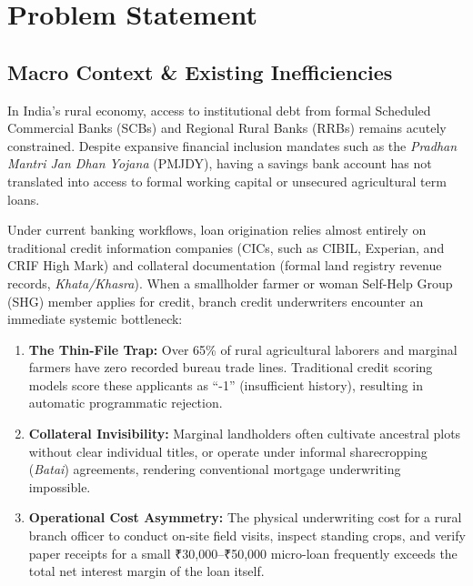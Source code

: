 \chapter{Problem Statement}
\label{chap:problem_statement}

\section{Macro Context \& Existing Inefficiencies}
In India's rural economy, access to institutional debt from formal Scheduled Commercial Banks (SCBs) and Regional Rural Banks (RRBs) remains acutely constrained. Despite expansive financial inclusion mandates such as the \textit{Pradhan Mantri Jan Dhan Yojana} (PMJDY), having a savings bank account has not translated into access to formal working capital or unsecured agricultural term loans. 

Under current banking workflows, loan origination relies almost entirely on traditional credit information companies (CICs, such as CIBIL, Experian, and CRIF High Mark) and collateral documentation (formal land registry revenue records, \textit{Khata/Khasra}). When a smallholder farmer or woman Self-Help Group (SHG) member applies for credit, branch credit underwriters encounter an immediate systemic bottleneck:
\begin{enumerate}
  \item \textbf{The Thin-File Trap:} Over 65\% of rural agricultural laborers and marginal farmers have zero recorded bureau trade lines. Traditional credit scoring models score these applicants as ``-1'' (insufficient history), resulting in automatic programmatic rejection.
  \item \textbf{Collateral Invisibility:} Marginal landholders often cultivate ancestral plots without clear individual titles, or operate under informal sharecropping (\textit{Batai}) agreements, rendering conventional mortgage underwriting impossible.
  \item \textbf{Operational Cost Asymmetry:} The physical underwriting cost for a rural branch officer to conduct on-site field visits, inspect standing crops, and verify paper receipts for a small ₹30,000--₹50,000 micro-loan frequently exceeds the total net interest margin of the loan itself.
\end{enumerate}

